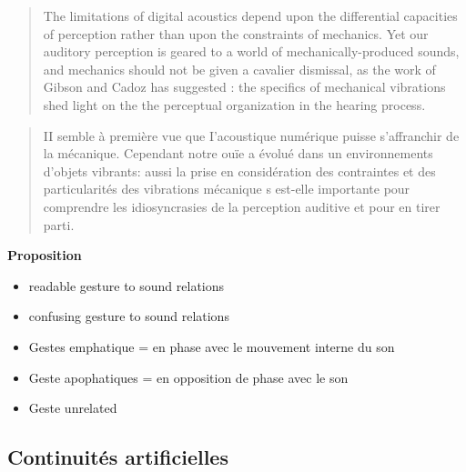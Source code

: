 \begin{quotation}
The limitations of digital acoustics depend upon the differential capacities of perception rather than upon the constraints of mechanics. Yet our auditory perception is geared to a world of mechanically-produced sounds, and mechanics should not be given a cavalier dismissal, as the work of Gibson and Cadoz has suggested : the specifics of mechanical vibrations shed light on the the perceptual organization in the hearing process.
\end{quotation}

\begin{quotation}
II semble à première  vue  que I'acoustique  numérique puisse  s'affranchir  de la mécanique. Cependant notre ouïe  a  évolué dans un  environnements d'objets vibrants: aussi la prise en considération  des  contraintes et des  particularités  des  vibrations  mécanique s  est-elle importante  pour  comprendre  les  idiosyncrasies de la perception  auditive et pour  en  tirer parti.
\end{quotation}


\textbf{Proposition}
\vspace{-1em}
\begin{itemize}[noitemsep]
\item readable gesture to sound relations
\item confusing gesture to sound relations
\end{itemize}

\vspace{-1em}
\begin{itemize}[noitemsep]
\item Gestes emphatique = en phase avec le mouvement interne du son
\item Geste apophatiques = en opposition de phase avec le son
\item Geste unrelated
\end{itemize}


\subsection{Continuités artificielles}

